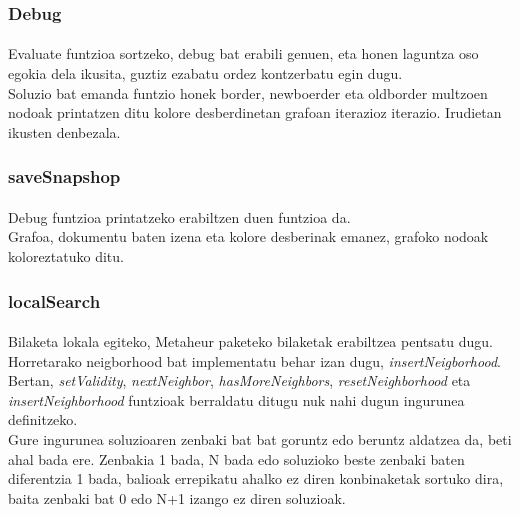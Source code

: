 \documentclass[eu,gi]{ifirak}\usepackage[]{graphicx}\usepackage[]{color}
\begin{document}
\subsubsection{Debug}
\paragraph{}
	Evaluate funtzioa sortzeko, debug bat erabili genuen, eta honen laguntza oso egokia dela ikusita, guztiz ezabatu ordez kontzerbatu egin dugu.\\
	
Soluzio bat emanda funtzio honek border, newboerder eta oldborder multzoen nodoak printatzen ditu kolore desberdinetan grafoan iterazioz iterazio. Irudietan ikusten denbezala.\\

\subsubsection{saveSnapshop}
\paragraph{}
	Debug funtzioa printatzeko erabiltzen duen funtzioa da. \\
Grafoa, dokumentu baten izena eta kolore desberinak emanez, grafoko nodoak koloreztatuko ditu. \\

\subsubsection{localSearch}
\paragraph{}
	Bilaketa lokala egiteko, Metaheur paketeko bilaketak erabiltzea pentsatu dugu. Horretarako neigborhood bat implementatu behar izan dugu, \textit{insertNeigborhood}. Bertan, \textit{setValidity}, \textit{nextNeighbor}, \textit{hasMoreNeighbors}, \textit{resetNeighborhood} eta \textit{insertNeighborhood} funtzioak berraldatu ditugu nuk nahi dugun ingurunea definitzeko.\\ 
	
	Gure ingurunea soluzioaren zenbaki bat bat goruntz edo beruntz aldatzea da, beti ahal bada ere. Zenbakia 1 bada, N bada edo soluzioko beste zenbaki baten diferentzia 1 bada, balioak errepikatu ahalko ez diren konbinaketak sortuko dira, baita zenbaki bat 0 edo N+1 izango ez diren soluzioak.\\
	
\end{document}
